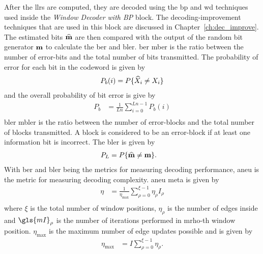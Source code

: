 After the \glspl{llr} are computed, they are decoded using the \gls{bp} and \gls{wd} techniques used inside the \emph{Window Decoder with BP} block. The decoding-improvement techniques that are used in this block are discussed in Chapter~\ref{ch:dec_improve}. The estimated bits $\widehat{\mathbf{m}}$ are then compared with the output of the random bit generator $\mathbf{m}$ to calculate the \gls{ber} and \gls{bler}. \gls{ber} \gls{mber} is the ratio between the number of error-bits and the total number of bits transmitted. The probability of error for each bit in the codeword is given by
\begin{align}
P_b(i)&=P\{\widehat{X}_i\neq X_i\}\\
\end{align}
and the overall probability of bit error is give by
\begin{align}
P_b&=\frac{1}{Ln}\sum_{i=0}^{Ln-1}P_b(i)\\
\end{align}
\gls{bler} \gls{mbler} is the ratio between the number of error-blocks and the total number of blocks transmitted. A block is considered to be an error-block if at least one information bit is incorrect. The \gls{bler} is given by
\begin{align}
P_L&=P\{\widehat{\mathbf{m}}\neq \mathbf{m}\}.
\end{align}
With \gls{ber} and \gls{bler} being the metrics for measuring decoding performance, \gls{aneu} is the metric for measuring decoding complexity. \gls{aneu} \gls{meta} is given by
\begin{align}
\eta&=\frac{1}{\eta_{\text{max}}}\sum_{\rho=0}^{\xi-1}\eta_\rho I_\rho\\
\end{align}
where $\xi$ is the total number of window positions, $\eta_\rho$ is the number of edges inside and $\gls{mI}_\rho$ is the number of iterations performed in \gls{mrho}-th window position. $\eta_{\text{max}}$ is the maximum number of edge updates possible and is given by
\begin{align}
\eta_{\text{max}}&=I\sum_{\rho=0}^{\xi-1}\eta_\rho.
\end{align}